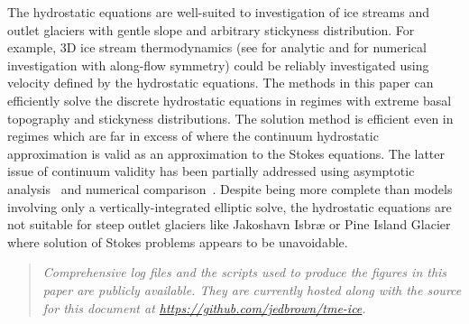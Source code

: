 The hydrostatic equations are well-suited to investigation of ice streams and outlet glaciers with gentle slope and arbitrary stickyness distribution.
For example, 3D ice stream thermodynamics (see \citet{raymond2000energy} for analytic and \citet{truffer2003isbrae} for numerical investigation with along-flow symmetry) could be reliably investigated using velocity defined by the hydrostatic equations.
The methods in this paper can efficiently solve the discrete hydrostatic equations in regimes with extreme basal topography and stickyness distributions.
The solution method is efficient even in regimes which are far in excess of where the continuum hydrostatic approximation is valid as an approximation to the Stokes equations.
The latter issue of continuum validity has been partially addressed using asymptotic analysis~\citep{schoof2010thin} and numerical comparison~\citep{hindmarsh2004numerical,pattyn2008beh}.
Despite being more complete than models involving only a vertically-integrated elliptic solve, the hydrostatic equations are not suitable for steep outlet glaciers like Jakoshavn Isbr{\ae} or Pine Island Glacier where solution of Stokes problems appears to be unavoidable.

\medskip
\begin{quote}\it
  Comprehensive log files and the scripts used to produce the figures in this paper are publicly available.
  They are currently hosted along with the source for this document at \url{https://github.com/jedbrown/tme-ice}.
\end{quote}
